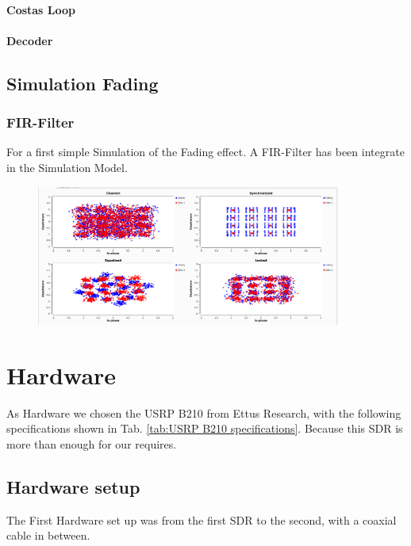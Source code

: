 \paragraph{Costas Loop}

\paragraph{Decoder}




\subsection{Simulation Fading}

\subsubsection{FIR-Filter}

For a first simple Simulation of the Fading effect. A FIR-Filter has been integrate in the Simulation Model.
\begin{figure}

 	\includegraphics[width=10cm]{./figures/screenshots/QAM16_Fading_2.png}
 \end{figure}


\section{Hardware}

As Hardware we chosen the USRP B210 from Ettus Research, with the following specifications shown in Tab. \ref{tab:USRP B210 specifications}. Because this SDR is more than enough for our requires.

\subsection{Hardware setup}

The First Hardware set up was from the first SDR to the second, with a coaxial cable in between. 

